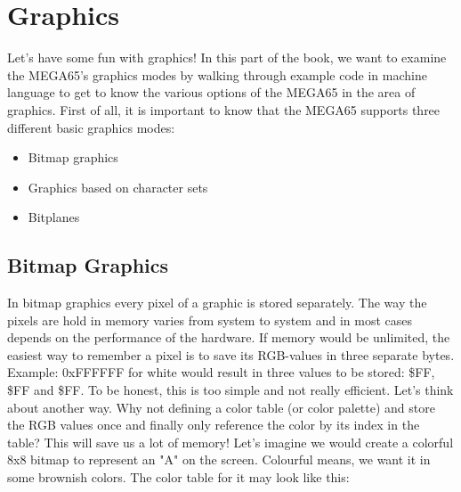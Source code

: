 \usepackage{colortbl}
\usepackage{adjustbox}


\newcommand{\blk}{\cellcolor[rgb]{0,0,0}\textcolor{white} 0 }
\newcommand{\bwn}{\cellcolor[rgb]{.26,.22,0}\textcolor{white} 9 }
\newcommand{\ora}{\cellcolor[rgb]{.44,.31,.15} 8 }
\newcommand{\red}{\cellcolor[rgb]{.6,.4,.35} A }
\newcommand{\lgr}{\cellcolor[rgb]{.58,.58,.58} F }
\newcommand{\yel}{\cellcolor[rgb]{.72,.78,.44} 7 }

\newcommand{\redb}{\cellcolor[rgb]{.6,.4,.35} 1 }

\chapter{Graphics}
\label{cha:graphics}

Let's have some fun with graphics!
In this part of the book, we want to examine the MEGA65's graphics modes by walking through example code in machine language to get to know the various options of the MEGA65 in the area of graphics. First of all, it is important to know that the MEGA65 supports three different basic graphics modes:

\begin{itemize}
	\item Bitmap graphics
	\item Graphics based on character sets
	\item Bitplanes
\end{itemize}


\section*{Bitmap Graphics}

In bitmap graphics every pixel of a graphic is stored separately. The way the pixels are hold in memory varies from system to system and in most cases depends on the performance of the hardware. If memory would be unlimited, the easiest way to remember a pixel is to save its RGB-values in three separate bytes. Example: 0xFFFFFF for white would result in three values to be stored: \$FF, \$FF and \$FF. To be honest, this is too simple and not really efficient. Let’s think about another way. Why not defining a color table (or color palette) and store the RGB values once and finally only reference the color by its index in the table? This will save us a lot of memory! Let's imagine we would create a colorful 8x8 bitmap to represent an "A" on the screen. Colourful means, we want it in some brownish colors. The color table for it may look like this:

